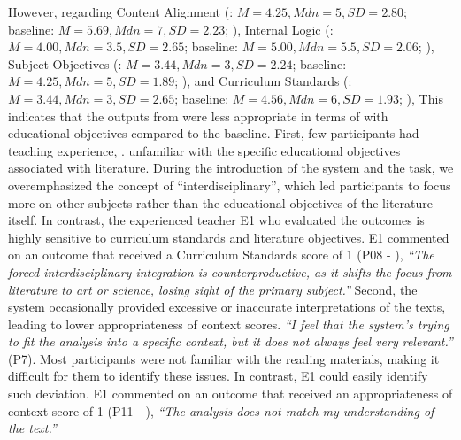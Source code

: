 However, regarding Content Alignment (\name{}: $M = 4.25, Mdn=5, SD = 2.80$; baseline: $M = 5.69, Mdn=7, SD = 2.23$; ), Internal Logic (\name{}: $M = 4.00, Mdn=3.5, SD = 2.65$; baseline: $M = 5.00, Mdn=5.5, SD = 2.06$; ), Subject Objectives (\name{}: $M = 3.44, Mdn=3, SD = 2.24$; baseline: $M = 4.25, Mdn=5, SD = 1.89$; ), and Curriculum Standards (\name{}: $M = 3.44, Mdn=3, SD = 2.65$; baseline: $M = 4.56, Mdn=6, SD = 1.93$; ), 
This indicates that the outputs from \name{} were less appropriate in terms of  with educational objectives compared to the baseline. 
First, few participants had teaching experience, .
 unfamiliar with the specific educational objectives associated with literature. 
During the introduction of the system and the task, we overemphasized the concept of ``interdisciplinary'', which led participants to focus more on other subjects rather than the educational objectives of the literature itself. In contrast, the experienced teacher E1 who evaluated the outcomes is highly sensitive to curriculum standards and literature objectives. E1 commented on an outcome that received a Curriculum Standards score of 1 (P08 - \name{}), \textit{``The forced interdisciplinary integration is counterproductive, as it shifts the focus from literature to art or science, losing sight of the primary subject.''}
Second, the system occasionally provided excessive or inaccurate interpretations of the texts, leading to lower appropriateness of context scores. \textit{``I feel that the system's trying to fit the analysis into a specific context, but it does not always feel very relevant.''} (P7). 
Most participants were not familiar with the reading materials, making it difficult for them to identify these issues. In contrast, E1 could easily identify such deviation. E1 commented on an outcome that received an appropriateness of context score of 1 (P11 - \name{}), \textit{``The analysis does not match my understanding of the text.''}

